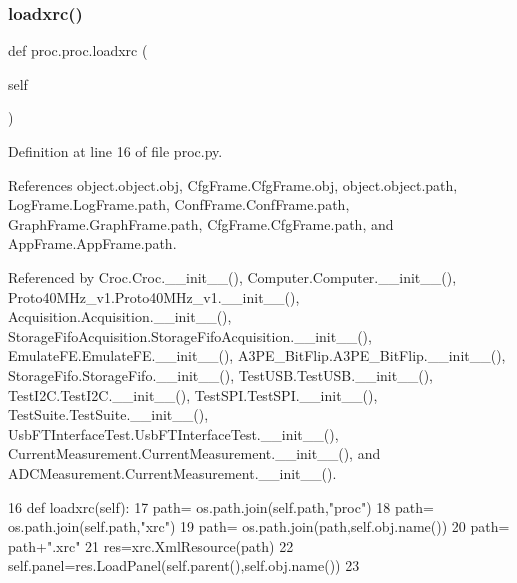 \subsubsection{\texorpdfstring{loadxrc()}{loadxrc()}}
{\footnotesize\ttfamily def proc.\+proc.\+loadxrc (\begin{DoxyParamCaption}\item[{}]{self }\end{DoxyParamCaption})}



Definition at line 16 of file proc.\+py.



References object.\+object.\+obj, Cfg\+Frame.\+Cfg\+Frame.\+obj, object.\+object.\+path, Log\+Frame.\+Log\+Frame.\+path, Conf\+Frame.\+Conf\+Frame.\+path, Graph\+Frame.\+Graph\+Frame.\+path, Cfg\+Frame.\+Cfg\+Frame.\+path, and App\+Frame.\+App\+Frame.\+path.



Referenced by Croc.\+Croc.\+\_\+\+\_\+init\+\_\+\+\_\+(), Computer.\+Computer.\+\_\+\+\_\+init\+\_\+\+\_\+(), Proto40\+M\+Hz\+\_\+v1.\+Proto40\+M\+Hz\+\_\+v1.\+\_\+\+\_\+init\+\_\+\+\_\+(), Acquisition.\+Acquisition.\+\_\+\+\_\+init\+\_\+\+\_\+(), Storage\+Fifo\+Acquisition.\+Storage\+Fifo\+Acquisition.\+\_\+\+\_\+init\+\_\+\+\_\+(), Emulate\+F\+E.\+Emulate\+F\+E.\+\_\+\+\_\+init\+\_\+\+\_\+(), A3\+P\+E\+\_\+\+Bit\+Flip.\+A3\+P\+E\+\_\+\+Bit\+Flip.\+\_\+\+\_\+init\+\_\+\+\_\+(), Storage\+Fifo.\+Storage\+Fifo.\+\_\+\+\_\+init\+\_\+\+\_\+(), Test\+U\+S\+B.\+Test\+U\+S\+B.\+\_\+\+\_\+init\+\_\+\+\_\+(), Test\+I2\+C.\+Test\+I2\+C.\+\_\+\+\_\+init\+\_\+\+\_\+(), Test\+S\+P\+I.\+Test\+S\+P\+I.\+\_\+\+\_\+init\+\_\+\+\_\+(), Test\+Suite.\+Test\+Suite.\+\_\+\+\_\+init\+\_\+\+\_\+(), Usb\+F\+T\+Interface\+Test.\+Usb\+F\+T\+Interface\+Test.\+\_\+\+\_\+init\+\_\+\+\_\+(), Current\+Measurement.\+Current\+Measurement.\+\_\+\+\_\+init\+\_\+\+\_\+(), and A\+D\+C\+Measurement.\+Current\+Measurement.\+\_\+\+\_\+init\+\_\+\+\_\+().


\begin{DoxyCode}
16     \textcolor{keyword}{def }loadxrc(self):
17         path= os.path.join(self.path,\textcolor{stringliteral}{"proc"})
18         path= os.path.join(self.path,\textcolor{stringliteral}{"xrc"})
19         path= os.path.join(path,self.obj.name())
20         path= path+\textcolor{stringliteral}{".xrc"}
21         res=xrc.XmlResource(path)
22         self.panel=res.LoadPanel(self.parent(),self.obj.name())
23         
\end{DoxyCode}
\mbox{\label{classproc_1_1proc_a41bdd5dd3af283e3f0053c1a0c7fa7bf}} 
